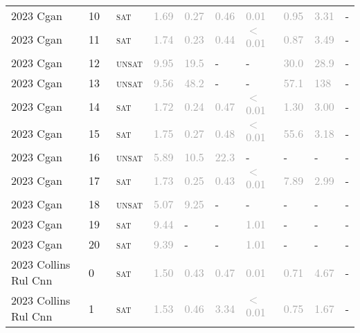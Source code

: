 \begin{center}
{\begin{longtable}{@{}llllllllll@{}}
2023 Cgan & 10 & ~\textsc{sat} & \textcolor{darkgray}{1.69} & \textcolor{darkgray}{0.27} & \textcolor{darkgray}{0.46} & \textcolor{darkgray}{0.01} & \textcolor{darkgray}{0.95} & \textcolor{darkgray}{3.31} & - \\
2023 Cgan & 11 & ~\textsc{sat} & \textcolor{darkgray}{1.74} & \textcolor{darkgray}{0.23} & \textcolor{darkgray}{0.44} & \textcolor{darkgray}{$<$0.01} & \textcolor{darkgray}{0.87} & \textcolor{darkgray}{3.49} & - \\
2023 Cgan & 12 & ~\textsc{unsat} & \textcolor{darkgray}{9.95} & \textcolor{darkgray}{19.5} & - & - & \textcolor{darkgray}{30.0} & \textcolor{darkgray}{28.9} & - \\
2023 Cgan & 13 & ~\textsc{unsat} & \textcolor{darkgray}{9.56} & \textcolor{darkgray}{48.2} & - & - & \textcolor{darkgray}{57.1} & \textcolor{darkgray}{138} & - \\
2023 Cgan & 14 & ~\textsc{sat} & \textcolor{darkgray}{1.72} & \textcolor{darkgray}{0.24} & \textcolor{darkgray}{0.47} & \textcolor{darkgray}{$<$0.01} & \textcolor{darkgray}{1.30} & \textcolor{darkgray}{3.00} & - \\
2023 Cgan & 15 & ~\textsc{sat} & \textcolor{darkgray}{1.75} & \textcolor{darkgray}{0.27} & \textcolor{darkgray}{0.48} & \textcolor{darkgray}{$<$0.01} & \textcolor{darkgray}{55.6} & \textcolor{darkgray}{3.18} & - \\
2023 Cgan & 16 & ~\textsc{unsat} & \textcolor{darkgray}{5.89} & \textcolor{darkgray}{10.5} & \textcolor{darkgray}{22.3} & - & - & - & - \\
2023 Cgan & 17 & ~\textsc{sat} & \textcolor{darkgray}{1.73} & \textcolor{darkgray}{0.25} & \textcolor{darkgray}{0.43} & \textcolor{darkgray}{$<$0.01} & \textcolor{darkgray}{7.89} & \textcolor{darkgray}{2.99} & - \\
2023 Cgan & 18 & ~\textsc{unsat} & \textcolor{darkgray}{5.07} & \textcolor{darkgray}{9.25} & - & - & - & - & - \\
2023 Cgan & 19 & ~\textsc{sat} & \textcolor{darkgray}{9.44} & - & - & \textcolor{darkgray}{1.01} & - & - & - \\
2023 Cgan & 20 & ~\textsc{sat} & \textcolor{darkgray}{9.39} & - & - & \textcolor{darkgray}{1.01} & - & - & - \\
\midrule
2023 Collins Rul Cnn & 0 & ~\textsc{sat} & \textcolor{darkgray}{1.50} & \textcolor{darkgray}{0.43} & \textcolor{darkgray}{0.47} & \textcolor{darkgray}{0.01} & \textcolor{darkgray}{0.71} & \textcolor{darkgray}{4.67} & - \\
2023 Collins Rul Cnn & 1 & ~\textsc{sat} & \textcolor{darkgray}{1.53} & \textcolor{darkgray}{0.46} & \textcolor{darkgray}{3.34} & \textcolor{darkgray}{$<$0.01} & \textcolor{darkgray}{0.75} & \textcolor{darkgray}{1.67} & - \\

\end{longtable}}
\end{center}
